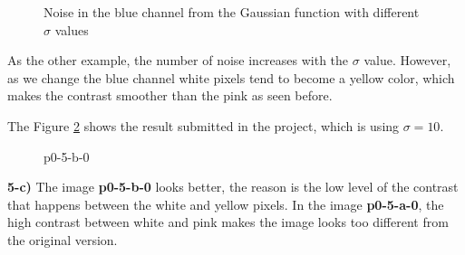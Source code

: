 \documentclass[12pt,a4paper]{article}
\begin{document}
\begin{figure}[!h]
	\quad
	\caption{Noise in the blue channel  from the Gaussian function with different $\sigma$ values}%
	\label{fig:blue-sigma}%
\end{figure}

As the other example, the number of noise increases with the $\sigma$ value. However, as we change the blue channel white pixels tend to become a yellow color, which makes the contrast smoother than the pink as seen before.

The Figure \ref{fig:p0-5-b-0} shows the result submitted in the project, which is using $\sigma = 10$.

\begin{figure}[!h]
	\centering
	{%
		\setlength{\fboxsep}{1pt}%
		\setlength{\fboxrule}{1pt}%
	}%
	\caption{p0-5-b-0}
	\label{fig:p0-5-b-0}
\end{figure}


\textbf{5-c) } The image \textbf{p0-5-b-0} looks better, the reason is the low level of the contrast that happens between the white and yellow pixels. In the image \textbf{p0-5-a-0}, the high contrast between white and pink makes the image looks too different from the original version.
\end{document}
